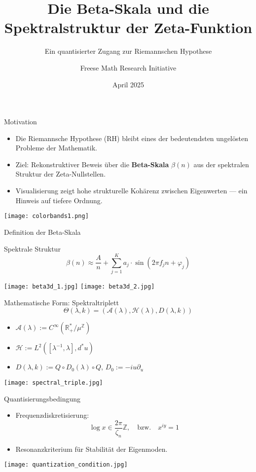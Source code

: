 \documentclass{beamer}
\title{Die Beta-Skala und die Spektralstruktur der Zeta-Funktion}
\subtitle{Ein quantisierter Zugang zur Riemannschen Hypothese}
\author{Freese Math Research Initiative}
\date{April 2025}
\begin{document}
\begin{frame}
  \titlepage
\end{frame}

\begin{frame}{Motivation}
  \begin{itemize}
    \item Die Riemannsche Hypothese (RH) bleibt eines der bedeutendsten ungelösten Probleme der Mathematik.
    \item Ziel: Rekonstruktiver Beweis über die \textbf{Beta-Skala} $\beta(n)$ aus der spektralen Struktur der Zeta-Nullstellen.
    \item Visualisierung zeigt hohe strukturelle Kohärenz zwischen Eigenwerten — ein Hinweis auf tiefere Ordnung.
  \end{itemize}
  \vfill
  \texttt{[image: colorbands1.png]} %
\end{frame}

\begin{frame}{Definition der Beta-Skala}
  \begin{block}{Spektrale Struktur}
    \[
      \beta(n) \approx \frac{A}{n} + \sum_{j=1}^K a_j \cdot \sin(2\pi f_j n + \varphi_j)
    \]
  \end{block}
  \vfill
  \texttt{[image: beta3d\_1.jpg]}
  \texttt{[image: beta3d\_2.jpg]}
\end{frame}

\begin{frame}{Mathematische Form: Spektraltriplett}
  \[
  \Theta(\lambda,k) = (\mathcal{A}(\lambda), \mathcal{H}(\lambda), D(\lambda,k))
  \]
  \begin{itemize}
    \item $\mathcal{A}(\lambda) := C^\infty(\mathbb{R}_+^*/\mu^\mathbb{Z})$
    \item $\mathcal{H} := L^2([\lambda^{-1},\lambda], d^*u)$
    \item $D(\lambda,k) := Q \circ D_0(\lambda) \circ Q$, \quad $D_0 := -i u \partial_u$
  \end{itemize}
  \texttt{[image: spectral\_triple.jpg]}
\end{frame}

\begin{frame}{Quantisierungsbedingung}
  \begin{itemize}
    \item Frequenzdiskretisierung:
    \[
      \log x \in \frac{2\pi}{\zeta_n} \mathbb{Z}, \quad \text{bzw.} \quad x^{iy} = 1
    \]
    \item Resonanzkriterium für Stabilität der Eigenmoden.
  \end{itemize}
  \texttt{[image: quantization\_condition.jpg]}
\end{frame}
\end{document}
